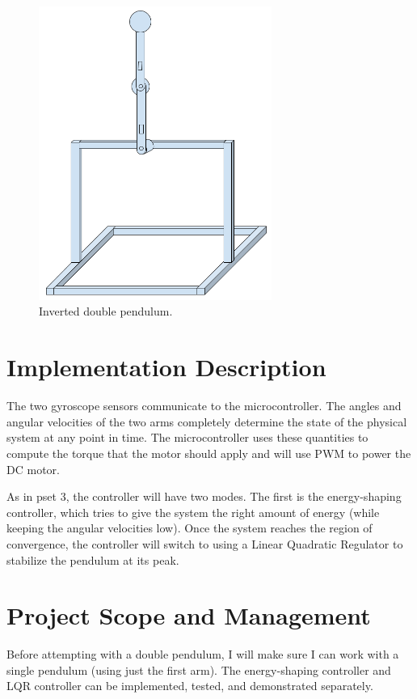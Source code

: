 \documentclass{article}
\begin{document}
\begin{figure}[h]
	\centering
	\includegraphics[width=3in]{inverted_double_pendulum.png}
	\caption{Inverted double pendulum.}
	\label{fig:inverted_double_pendulum}
\end{figure}

\section{Implementation Description}

The two gyroscope sensors communicate to the microcontroller. The angles and angular velocities of the two arms completely determine the state of the physical system at any point in time. The microcontroller uses these quantities to compute the torque that the motor should apply and will use PWM to power the DC motor.

As in pset 3, the controller will have two modes. The first is the energy-shaping controller, which tries to give the system the right amount of energy (while keeping the angular velocities low). Once the system reaches the region of convergence, the controller will switch to using a Linear Quadratic Regulator to stabilize the pendulum at its peak.

\section{Project Scope and Management}
Before attempting with a double pendulum, I will make sure I can work with a single pendulum (using just the first arm). The energy-shaping controller and LQR controller can be implemented, tested, and demonstrated separately.
\end{document}
